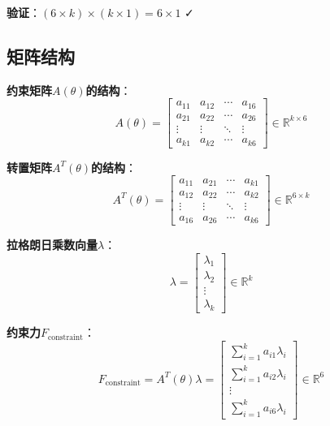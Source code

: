 \documentclass[12pt,a4paper]{article}
\begin{document}
\textbf{验证}：$(6 \times k) \times (k \times 1) = 6 \times 1$ ✓

\subsection{矩阵结构}

\textbf{约束矩阵$A(\theta)$的结构}：
\begin{equation}
A(\theta) = \begin{bmatrix}
a_{11} & a_{12} & \cdots & a_{16} \\
a_{21} & a_{22} & \cdots & a_{26} \\
\vdots & \vdots & \ddots & \vdots \\
a_{k1} & a_{k2} & \cdots & a_{k6}
\end{bmatrix} \in \mathbb{R}^{k \times 6}
\end{equation}

\textbf{转置矩阵$A^T(\theta)$的结构}：
\begin{equation}
A^T(\theta) = \begin{bmatrix}
a_{11} & a_{21} & \cdots & a_{k1} \\
a_{12} & a_{22} & \cdots & a_{k2} \\
\vdots & \vdots & \ddots & \vdots \\
a_{16} & a_{26} & \cdots & a_{k6}
\end{bmatrix} \in \mathbb{R}^{6 \times k}
\end{equation}

\textbf{拉格朗日乘数向量$\lambda$}：
\begin{equation}
\lambda = \begin{bmatrix}
\lambda_1 \\
\lambda_2 \\
\vdots \\
\lambda_k
\end{bmatrix} \in \mathbb{R}^k
\end{equation}

\textbf{约束力$F_{\text{constraint}}$}：
\begin{equation}
F_{\text{constraint}} = A^T(\theta)\lambda = \begin{bmatrix}
\sum_{i=1}^k a_{i1}\lambda_i \\
\sum_{i=1}^k a_{i2}\lambda_i \\
\vdots \\
\sum_{i=1}^k a_{i6}\lambda_i
\end{bmatrix} \in \mathbb{R}^6
\end{equation}
\end{document}
